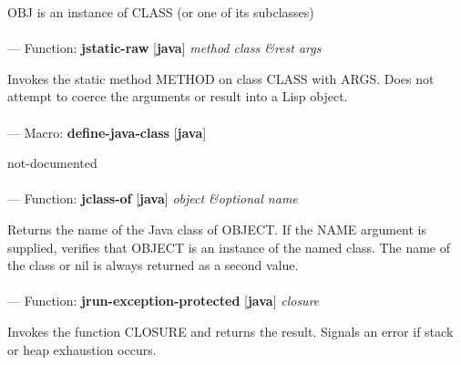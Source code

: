 \begin{adjustwidth}{5em}{5em}
OBJ is an instance of CLASS (or one of its subclasses)
\end{adjustwidth}

\paragraph{}
\label{JAVA:JSTATIC-RAW}
--- Function: \textbf{jstatic-raw} [\textbf{java}] \textit{method class \&rest args}

\begin{adjustwidth}{5em}{5em}
Invokes the static method METHOD on class CLASS with ARGS. Does not attempt to coerce the arguments or result into a Lisp object.
\end{adjustwidth}

\paragraph{}
\label{JAVA:DEFINE-JAVA-CLASS}
--- Macro: \textbf{define-java-class} [\textbf{java}] \textit{}

\begin{adjustwidth}{5em}{5em}
not-documented
\end{adjustwidth}

\paragraph{}
\label{JAVA:JCLASS-OF}
--- Function: \textbf{jclass-of} [\textbf{java}] \textit{object \&optional name}

\begin{adjustwidth}{5em}{5em}
Returns the name of the Java class of OBJECT. If the NAME argument is
  supplied, verifies that OBJECT is an instance of the named class. The name
  of the class or nil is always returned as a second value.
\end{adjustwidth}

\paragraph{}
\label{JAVA:JRUN-EXCEPTION-PROTECTED}
--- Function: \textbf{jrun-exception-protected} [\textbf{java}] \textit{closure}

\begin{adjustwidth}{5em}{5em}
Invokes the function CLOSURE and returns the result.  Signals an error if stack or heap exhaustion occurs.
\end{adjustwidth}

